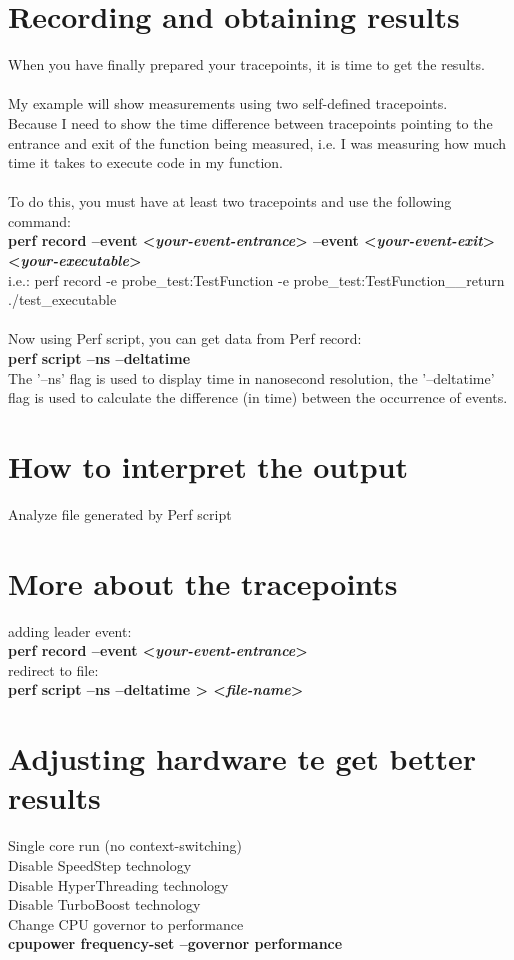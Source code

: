 \documentclass[11pt,onecolumn]{article}
\begin{document}
\section{Recording and obtaining results}

When you have finally prepared your tracepoints, it is time to get the results.\\\\
My example will show measurements using two self-defined tracepoints.\\
Because I need to show the time difference between tracepoints pointing to the entrance and exit of the function being measured, i.e. I was measuring how much time it takes to execute code in my function.\\\\
To do this, you must have at least two tracepoints and use the following command:\\
\textbf{perf record --event <\textit{your-event-entrance}> --event <\textit{your-event-exit}> <\textit{your-executable}>}\\
i.e.: perf record -e probe\_test:TestFunction -e probe\_test:TestFunction\_\_return ./test\_executable\\\\
Now using Perf script, you can get data from Perf record:\\
\textbf{perf script --ns --deltatime}\\
The '--ns' flag is used to display time in nanosecond resolution, the '--deltatime' flag is used to calculate the difference (in time) between the occurrence of events.


\section{How to interpret the output}

Analyze file generated by Perf script

\section{More about the tracepoints}

adding leader event:\\
\textbf{perf record --event <\textit{your-event-entrance}>}\\
redirect to file:\\
\textbf{perf script --ns --deltatime > <\textit{file-name}>}\\

\section{Adjusting hardware te get better results}

Single core run (no context-switching)\\
Disable SpeedStep technology\\
Disable HyperThreading technology\\
Disable TurboBoost technology\\
Change CPU governor to performance\\
\textbf{cpupower frequency-set --governor performance}
\end{document}
